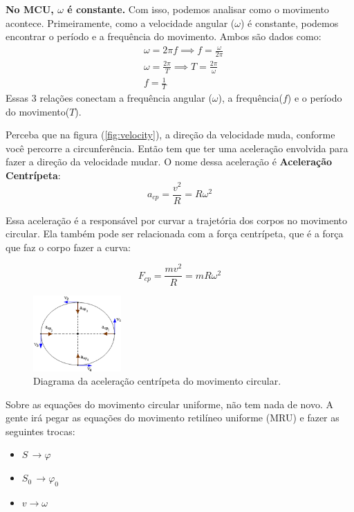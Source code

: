 \documentclass[12pt]{extarticle}
\newcommand{\<}{\langle}
\renewcommand{\>}{\rangle}
\theoremstyle{definition}
\begin{document}
\textbf{No MCU, $\omega$ é constante.} Com isso, podemos analisar como o movimento acontece. Primeiramente, como a velocidade angular ($\omega$) é constante, podemos encontrar o período e a frequência do movimento. Ambos são dados como:
\begin{equation}
    \begin{split}
        &\omega = 2\pi f \implies f= \frac{\omega}{2\pi} \\
    &\omega = \frac{2\pi}{T} \implies T = \frac{2\pi}{\omega}\\
    &f = \frac{1}{T}
    \end{split}
\end{equation}
Essas 3 relações conectam a frequência angular ($\omega$), a frequência($f$) e o período do movimento($T$).

Perceba que na figura (\ref{fig:velocity}), a direção da velocidade muda, conforme você percorre a circunferência. Então tem que ter uma aceleração envolvida para fazer a direção da velocidade mudar. O nome dessa aceleração é \textbf{Aceleração Centrípeta}:
\begin{equation}
    a_{cp}=\frac{v^2}{R} = R\omega^2
\end{equation}

Essa aceleração é a responsável por curvar a trajetória dos corpos no movimento circular. Ela também pode ser relacionada com a força centrípeta, que é a força que faz o corpo fazer a curva:

\begin{equation}
    F_{cp} =\frac{mv^2}{R} =mR\omega^2
\end{equation}

\begin{figure}[H]
    \centering
    \includegraphics[width=0.3\textwidth]{unnamed.jpg}
    \caption{Diagrama da aceleração centrípeta do movimento circular.}
    \label{fig:my_label}
\end{figure}

Sobre as equações do movimento circular uniforme, não tem nada de novo. A gente irá pegar as equações do movimento retilíneo uniforme (MRU) e fazer as seguintes trocas:
\begin{itemize}
    \item $S\,\rightarrow \varphi$
    \item $S_0\,\rightarrow \varphi_0$
    \item $v\rightarrow \omega$
\end{itemize}
\end{document}
